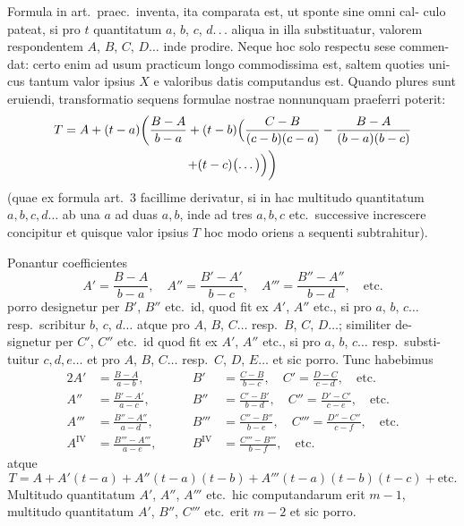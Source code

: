 \documentclass[12pt,a4paper]{article}
\begin{document}
\smallskip\noindent
Formula in art.\ praec.\ inventa, ita comparata est, ut sponte sine omni cal-
culo pateat, si pro $t$ quantitatum $a$, $b$, $c$, $d.\,.\,.$ aliqua in illa substituatur, valorem
respondentem $A$, $B$, $C$, $D\dots$ inde prodire. Neque hoc solo respectu sese commen-
dat: certo enim ad usum practicum longo commodissima est, saltem quoties uni-
cus tantum valor ipsius $X$ e valoribus datis computandus est. Quando plures
sunt eruiendi, transformatio sequens formulae nostrae nonnunquam praeferri
poterit:
\begin{multline*}
T = A + (t-a)\biggl(\frac{B-A}{b-a}+(t-b)\Bigl(\frac{C-B}{(c-b)(c-a)}-\frac{B-A}{(b-a)(b-c)}\\
+(t-c)\bigl(\dots\bigr)\Bigr)\biggr)
\end{multline*}
(quae ex formula art.\ 3 facillime derivatur, si in hac multitudo quantitatum
$a,b,c,d\dots$ ab una $a$ ad duas $a,b$, inde ad tres $a,b,c$ etc.\ successive increscere
concipitur et quisque valor ipsius $T$ hoc modo oriens a sequenti subtrahitur).

\smallskip\noindent
Ponantur coefficientes
\begin{equation*}
A' = \frac{B-A}{b-a}, \quad
A'' = \frac{B'-A'}{b-c}, \quad
A''' = \frac{B''-A''}{b-d}, \quad \text{etc.}
\end{equation*}
porro designetur per $B'$, $B''$ etc.\ id, quod fit ex $A'$, $A''$ etc., si pro $a$, $b$, $c\dots$
resp.\ scribitur $b$, $c$, $d\dots$ atque pro $A$, $B$, $C\dots$ resp.\ $B$, $C$, $D\dots$; similiter de-
signetur per $C'$, $C''$ etc.\ id quod fit ex $A'$, $A''$ etc., si pro $a$, $b$, $c\dots$ resp.\ substi-
tuitur $c,d,e\dots$ et pro $A$, $B$, $C\dots$ resp.\ $C$, $D$, $E\dots$ et sic porro. Tunc habebimus
\begin{alignat*}{2}
A' &= \frac{B-A}{a-b}, &\qquad B' &= \frac{C-B}{b-c}, \quad C' = \frac{D-C}{c-d}, \quad \text{etc.}\\
A'' &= \frac{B'-A'}{a-c}, &\qquad B'' &= \frac{C'-B'}{b-d}, \quad C'' = \frac{D'-C'}{c-e}, \quad \text{etc.}\\
A''' &= \frac{B''-A''}{a-d}, &\qquad B''' &= \frac{C''-B''}{b-e}, \quad C''' = \frac{D''-C''}{c-f}, \quad \text{etc.}\\
A^{\mathrm{IV}} &= \frac{B'''-A'''}{a-e}, &\qquad B^{\mathrm{IV}} &= \frac{C'''-B'''}{b-f}, \quad \text{etc.}
\end{alignat*}
atque
\begin{equation*}
T = A + A'(t-a) + A''(t-a)(t-b) + A'''(t-a)(t-b)(t-c) + \text{etc.}
\end{equation*}
Multitudo quantitatum $A'$, $A''$, $A'''$ etc.\ hic computandarum erit $m-1$, multitudo
quantitatum $A'$, $B''$, $C'''$ etc.\ erit $m-2$ et sic porro.
\end{document}
